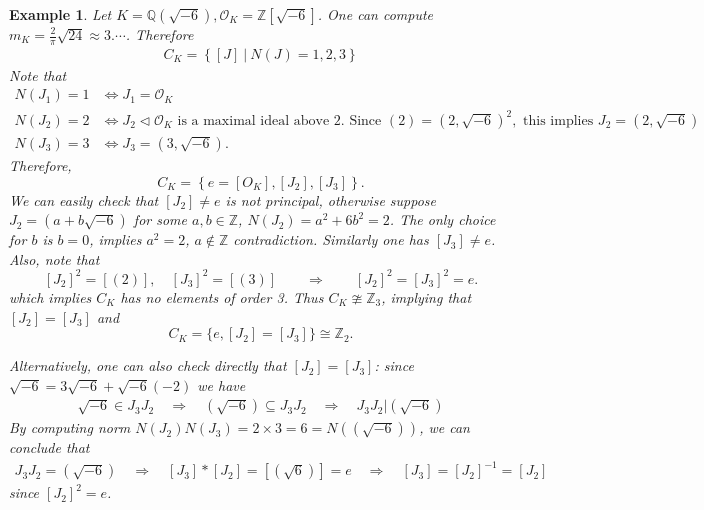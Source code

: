 \documentclass[11pt]{book}
\newtheorem{example}[theorem]{Example}
\begin{document}
\begin{example}
    Let \(K = \mathbb{Q}(\sqrt{-6}), \mathcal{O}_K = \mathbb{Z}[\sqrt{-6}] \). One can compute \(m_K = \frac{2}{\pi}\sqrt{24} \approx 3.\cdots\). Therefore
    \begin{align*}
        C_K = \left\{[J]\ |\  N(J)= 1,2,3\right\}
    \end{align*}
    Note that
    \begin{align*}
        N(J_1) = 1 &\Leftrightarrow J_1 = \mathcal{O}_K\\
        N(J_2) = 2 &\Leftrightarrow J_2 \triangleleft \mathcal{O}_K \text{ is a maximal ideal above }2. \text{ Since } (2) = (2,\sqrt{-6})^2, \text{ this implies } J_2 = (2,\sqrt{-6})\\
        N(J_3) = 3 &\Leftrightarrow J_3 = (3,\sqrt{-6}).
    \end{align*}
    Therefore, \[C_K = \left\{e=[O_K], [J_2], [J_3]\right\}.\] 
    We can easily check that \([J_2] \neq e\) is not principal, otherwise suppose \(J_2 = (a+b\sqrt{-6})\) for some \(a,b \in \mathbb{Z}\), \(N(J_2)= a^2+6b^2 = 2\). The only choice for \(b\) is \(b = 0\), implies  \(a^2 =2\), \(a \notin \mathbb{Z}\) contradiction. Similarly one has \([J_3] \neq e\). Also, note that 
    \[[J_2]^2 = [(2)], \quad [J_3]^2 = [(3)]  \quad \quad \Rightarrow \quad \quad [J_2]^2 = [J_3]^2 = e.\]
    which implies \(C_K\) has no elements of order 3. Thus \(C_K \ncong \mathbb{Z}_3\), implying that $[J_2] = [J_3]$ and 
    \[C_K = \{e, [J_2] = [J_3]\} \cong \mathbb{Z}_2.\]

    Alternatively, one can also check directly that $[J_2] = [J_3]$: since \(\sqrt{-6} = 3\sqrt{-6} + \sqrt{-6}(-2)\) we have
    \begin{align*}
        \sqrt{-6} \in J_3 J_2 \quad \Rightarrow \quad (\sqrt{-6}) \subseteq J_3 J_2\quad \Rightarrow \quad J_3 J_2 | (\sqrt{-6})
    \end{align*}
    By computing norm \(N(J_2) N(J_3) = 2 \times 3 = 6 = N\left((\sqrt{-6})\right)\), we can conclude that 
    \begin{align*}
        J_3J_2 = (\sqrt{-6}) \quad \Rightarrow \quad [J_3]*[J_2] = [(\sqrt{6})] = e \quad \Rightarrow \quad [J_3] = [J_2]^{-1} = [J_2]
    \end{align*}
    since $[J_2]^2 = e$.
\end{example}
\end{document}
